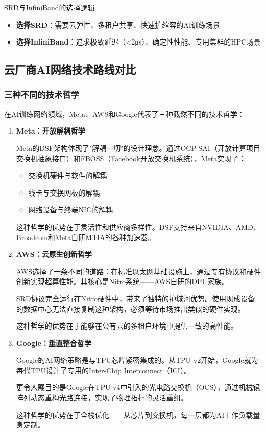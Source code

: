 \begin{insightbox}{SRD与InfiniBand的选择逻辑}
\begin{itemize}
    \item \textbf{选择SRD}：需要云弹性、多租户共享、快速扩缩容的AI训练场景
    \item \textbf{选择InfiniBand}：追求极致延迟（<2μs）、确定性性能、专用集群的HPC场景
\end{itemize}
\end{insightbox}

\subsection{云厂商AI网络技术路线对比}

\subsubsection{三种不同的技术哲学}

在AI训练网络领域，Meta、AWS和Google代表了三种截然不同的技术哲学：

\begin{enumerate}
    \item \textbf{Meta：开放解耦哲学}
    
    Meta的DSF架构体现了"解耦一切"的设计理念。通过OCP-SAI（开放计算项目交换机抽象接口）和FBOSS（Facebook开放交换机系统），Meta实现了：
    
    \begin{itemize}
        \item 交换机硬件与软件的解耦
        \item 线卡与交换网板的解耦
        \item 网络设备与终端NIC的解耦
    \end{itemize}
    
    这种哲学的优势在于灵活性和供应商多样性。DSF支持来自NVIDIA、AMD、Broadcom和Meta自研MTIA的各种加速器。
    
    \item \textbf{AWS：云原生创新哲学}
    
    AWS选择了一条不同的道路：在标准以太网基础设施上，通过专有协议和硬件创新实现超算性能。其核心是Nitro系统——AWS自研的DPU家族。
    
    SRD协议完全运行在Nitro硬件中，带来了独特的护城河优势。使用现成设备的数据中心无法直接复制这种架构，必须等待市场推出类似的硬件实现。
    
    这种哲学的优势在于能够在公有云的多租户环境中提供一致的高性能。
    
    \item \textbf{Google：垂直整合哲学}
    
    Google的AI网络策略是与TPU芯片紧密集成的。从TPU v2开始，Google就为每代TPU设计了专用的Inter-Chip Interconnect（ICI）。
    
    更令人瞩目的是Google在TPU v4中引入的光电路交换机（OCS），通过机械镜阵列动态重构光路连接，实现了物理拓扑的灵活重组。
    
    这种哲学的优势在于全栈优化——从芯片到交换机，每一层都为AI工作负载量身定制。
\end{enumerate}

